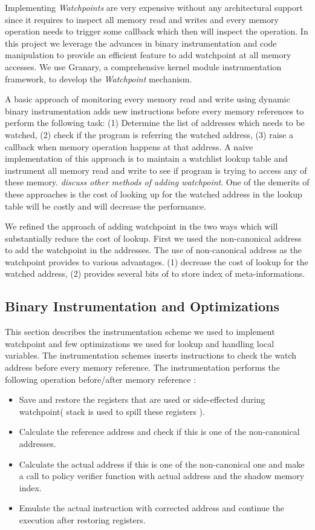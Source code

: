 Implementing  \emph{Watchpoints} are very expensive without any architectural support since it requires to inspect all memory read and writes and every memory operation needs to trigger some callback which then will inspect the operation.  In this project we leverage the advances in binary instrumentation and code manipulation to provide an efficient feature to add watchpoint at all memory accesses. We use Granary, a comprehensive kernel module instrumentation framework, to develop the \emph{Watchpoint} mechanism.

A basic approach of monitoring every memory read and write using dynamic binary instrumentation adds new instructions before every memory references to perform the following task: (1) Determine the list of addresses which needs to be watched, (2) check if the program is referring the watched address, (3) raise a callback when memory operation happens at that address. A naive implementation of this approach is to maintain a watchlist lookup table and instrument all memory read and write to see if program is trying to access any of these memory. \emph{discuss other methods of adding watchpoint}. One of the demerits of these approaches is the cost of looking up for the watched address in the lookup table will be costly and will decrease the performance.

We refined the approach of adding watchpoint in the two ways which will substantially reduce the cost of lookup.  First we used the non-canonical address to add the watchpoint in the addresses. The use of  non-canonical address as the watchpoint provides to various advantages. (1) decrease the cost of lookup for the watched address, (2) provides several bits of to store index of meta-informations.

\subsection {Binary Instrumentation and Optimizations}

This section describes the instrumentation scheme we used to implement watchpoint and few optimizations we used for lookup and handling local variables. The instrumentation schemes inserts instructions to check the watch address before every memory reference. The instrumentation performs the following operation before/after memory reference :

\begin{itemize}
\item Save and restore the registers that are used or side-effected during watchpoint( stack is used to spill these registers ).
\item Calculate the reference address and check if this is one of the non-canonical addresses.
\item Calculate the actual address if this is one of the non-canonical one and make a call to policy verifier function with actual address and the shadow memory index. 
\item Emulate the actual instruction with corrected address and continue the execution after restoring registers.
\end{itemize}

